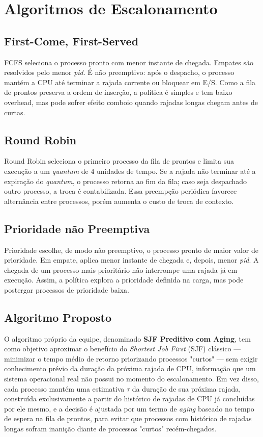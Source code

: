 \documentclass[conference]{IEEEtran}
\begin{document}
\section{Algoritmos de Escalonamento}

\subsection{First-Come, First-Served}

FCFS seleciona o processo pronto com menor instante de chegada. Empates são resolvidos pelo menor \textit{pid}. É não preemptivo: após o despacho, o processo mantém a CPU até terminar a rajada corrente ou bloquear em E/S. Como a fila de prontos preserva a ordem de inserção, a política é simples e tem baixo overhead, mas pode sofrer efeito comboio quando rajadas longas chegam antes de curtas.

\subsection{Round Robin}

Round Robin seleciona o primeiro processo da fila de prontos e limita sua execução a um \textit{quantum} de 4 unidades de tempo. Se a rajada não terminar até a expiração do \textit{quantum}, o processo retorna ao fim da fila; caso seja despachado outro processo, a troca é contabilizada. Essa preempção periódica favorece alternância entre processos, porém aumenta o custo de troca de contexto.

\subsection{Prioridade não Preemptiva}

Prioridade escolhe, de modo não preemptivo, o processo pronto de maior valor de prioridade. Em empate, aplica menor instante de chegada e, depois, menor \textit{pid}. A chegada de um processo mais prioritário não interrompe uma rajada já em execução. Assim, a política explora a prioridade definida na carga, mas pode postergar processos de prioridade baixa.

\subsection{Algoritmo Proposto}
\label{sec:algoritmo-proposto}

O algoritmo próprio da equipe, denominado \textbf{SJF Preditivo com Aging}, tem como objetivo aproximar o benefício do \textit{Shortest Job First} (SJF) clássico — minimizar o tempo médio de retorno priorizando processos "curtos" — sem exigir conhecimento prévio da duração da próxima rajada de CPU, informação que um sistema operacional real não possui no momento do escalonamento. Em vez disso, cada processo mantém uma estimativa $\tau$ da duração de sua próxima rajada, construída exclusivamente a partir do histórico de rajadas de CPU já concluídas por ele mesmo, e a decisão é ajustada por um termo de \textit{aging} baseado no tempo de espera na fila de prontos, para evitar que processos com histórico de rajadas longas sofram inanição diante de processos "curtos" recém-chegados.
\end{document}
